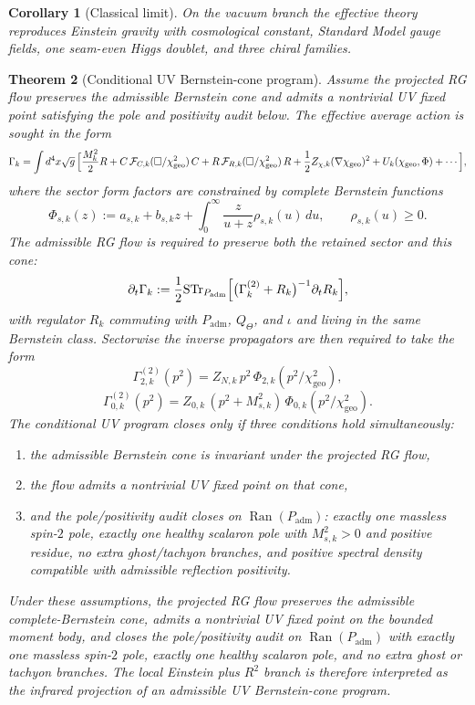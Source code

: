 \documentclass[11pt,a4paper]{article}
\newtheorem{theorem}{Theorem}[section]
\newtheorem{corollary}[theorem]{Corollary}
\theoremstyle{definition}
\theoremstyle{remark}
\newcommand{\inv}{\iota}
\newcommand{\chigeo}{\chi_{\mathrm{geo}}}
\newcommand{\Padm}{P_{\mathrm{adm}}}
\begin{document}
\begin{corollary}[Classical limit]
On the vacuum branch the effective theory reproduces Einstein gravity with cosmological constant, Standard Model gauge fields, one seam-even Higgs doublet, and three chiral families.
\end{corollary}

\begin{theorem}[Conditional UV Bernstein-cone program]
\label{thm:uv-bernstein-cone-completion}
Assume the projected RG flow preserves the admissible Bernstein cone and admits a nontrivial UV
fixed point satisfying the pole and positivity audit below. The effective average action is
sought in the form
\[
\Gamma_k
=
\int d^4x\sqrt g\,
\Bigl[
\frac{M_k^2}{2}R
+C\,\mathcal F_{C,k}(\Box/\chigeo^2)\,C
+R\,\mathcal F_{R,k}(\Box/\chigeo^2)\,R
+\frac12 Z_{\chi,k}(\nabla\chigeo)^2
+U_k(\chigeo,\Phi)
+\cdots
\Bigr],
\]
where the sector form factors are constrained by complete Bernstein functions
\[
\Phi_{s,k}(z)
:=
a_{s,k}+b_{s,k}z+\int_0^\infty \frac{z}{u+z}\rho_{s,k}(u)\,du,
\qquad
\rho_{s,k}(u)\ge 0.
\]
The admissible RG flow is required to preserve both the retained sector and this
cone:
\[
\partial_t\Gamma_k
:=
\frac12\mathrm{STr}_{\Padm}
\Bigl[
\bigl(\Gamma_k^{(2)}+R_k\bigr)^{-1}\partial_t R_k
\Bigr],
\]
with regulator $R_k$ commuting with $\Padm$, $Q_\Theta$, and $\inv$ and living in
the same Bernstein class. Sectorwise the inverse propagators are then required to
take the form
\[
\Gamma^{(2)}_{2,k}(p^2)
=
Z_{N,k}\,p^2\,\Phi_{2,k}(p^2/\chigeo^2),
\]
\[
\Gamma^{(2)}_{0,k}(p^2)
=
Z_{0,k}\,(p^2+M_{s,k}^2)\,\Phi_{0,k}(p^2/\chigeo^2).
\]
The conditional UV program closes only if three conditions hold simultaneously:
\begin{enumerate}[label=(\roman*), leftmargin=1.5em, topsep=3pt, itemsep=2pt]
    \item the admissible Bernstein cone is invariant under the projected RG flow,
    \item the flow admits a nontrivial UV fixed point on that cone,
    \item and the pole/positivity audit closes on $\operatorname{Ran}(\Padm)$:
    exactly one massless spin-$2$ pole, exactly one healthy scalaron pole with
    $M_{s,k}^2>0$ and positive residue, no extra ghost/tachyon branches, and
    positive spectral density compatible with admissible reflection positivity.
\end{enumerate}
Under these assumptions, the projected RG flow preserves the admissible complete-Bernstein cone,
admits a nontrivial UV fixed point on the bounded moment body, and closes the pole/positivity
audit on $\operatorname{Ran}(\Padm)$ with exactly one massless spin-$2$ pole, exactly one
healthy scalaron pole, and no extra ghost or tachyon branches. The local Einstein plus $R^2$
branch is therefore interpreted as the infrared projection of an admissible UV Bernstein-cone
program.
\end{theorem}
\end{document}
